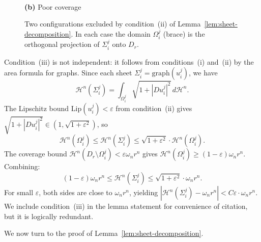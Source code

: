 \begin{figure}[ht]
\begin{minipage}[b]{0.45\textwidth}
\\[4pt]
      \textbf{(b)} Poor coverage
    \end{minipage}
    \caption{Two configurations excluded by condition~(ii) of Lemma~\ref{lem:sheet-decomposition}. In each case the domain $\Omega_i^j$ (brace) is the orthogonal projection of $\Sigma_i^j$ onto $D_r$.}
    \label{fig:condition-ii}
\end{figure}

Condition~(iii) is not independent: it follows from conditions~(i) and~(ii) by the area formula for graphs. Since each sheet $\Sigma_i^j = \mathrm{graph}(u_i^j)$, we have
\[
    \mathcal{H}^n(\Sigma_i^j) = \int_{\Omega_i^j} \sqrt{1 + |Du_i^j|^2} \, d\mathcal{H}^n.
\]
The Lipschitz bound $\mathrm{Lip}(u_i^j) < \varepsilon$ from condition~(ii) gives $\sqrt{1 + |Du_i^j|^2} \in (1, \sqrt{1+\varepsilon^2})$, so
\[
    \mathcal{H}^n(\Omega_i^j) \leq \mathcal{H}^n(\Sigma_i^j) \leq \sqrt{1+\varepsilon^2} \cdot \mathcal{H}^n(\Omega_i^j).
\]
The coverage bound $\mathcal{H}^n(D_r \setminus \Omega_i^j) < \varepsilon\omega_n r^n$ gives $\mathcal{H}^n(\Omega_i^j) \geq (1-\varepsilon)\omega_n r^n$. Combining:
\[
    (1-\varepsilon)\omega_n r^n \leq \mathcal{H}^n(\Sigma_i^j) \leq \sqrt{1+\varepsilon^2} \cdot \omega_n r^n.
\]
For small $\varepsilon$, both sides are close to $\omega_n r^n$, yielding $|\mathcal{H}^n(\Sigma_i^j) - \omega_n r^n| < C\varepsilon \cdot \omega_n r^n$. We include condition~(iii) in the lemma statement for convenience of citation, but it is logically redundant.

We now turn to the proof of Lemma~\ref{lem:sheet-decomposition}.

